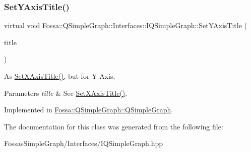 \subsubsection{\texorpdfstring{Set\+Y\+Axis\+Title()}{SetYAxisTitle()}}
{\footnotesize\ttfamily virtual void Fossa\+::\+Q\+Simple\+Graph\+::\+Interfaces\+::\+I\+Q\+Simple\+Graph\+::\+Set\+Y\+Axis\+Title (\begin{DoxyParamCaption}\item[{Q\+String}]{title }\end{DoxyParamCaption})\hspace{0.3cm}{\ttfamily [pure virtual]}}



As \hyperlink{class_fossa_1_1_q_simple_graph_1_1_interfaces_1_1_i_q_simple_graph_adfca7d41a47790e8403507544468ba86}{Set\+X\+Axis\+Title()}, but for Y-\/\+Axis. 


\begin{DoxyParams}{Parameters}
{\em title} & See \hyperlink{class_fossa_1_1_q_simple_graph_1_1_interfaces_1_1_i_q_simple_graph_adfca7d41a47790e8403507544468ba86}{Set\+X\+Axis\+Title()}. \\
\hline
\end{DoxyParams}


Implemented in \hyperlink{class_fossa_1_1_q_simple_graph_1_1_q_simple_graph_a41c9e9d34744f6e6550ca97dc0d2f488}{Fossa\+::\+Q\+Simple\+Graph\+::\+Q\+Simple\+Graph}.



The documentation for this class was generated from the following file\+:\begin{DoxyCompactItemize}
\item 
Fossas\+Simple\+Graph/\+Interfaces/I\+Q\+Simple\+Graph.\+hpp\end{DoxyCompactItemize}
